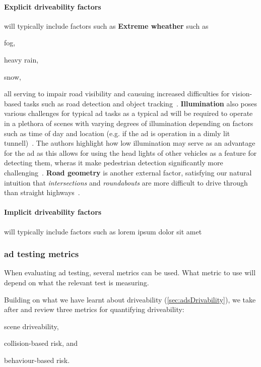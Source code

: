\paragraph{Explicit driveability factors} will typically include factors such as
\textbf{Extreme wheather} such as \begin{inparaenum}
    \item fog,
    \item heavy rain,
    \item snow,
\end{inparaenum}
all serving to impair road visibility and causuing increased difficulties for
vision-based tasks such as road detection and object
tracking~\cite[3136-3137]{safeToDrive}. \textbf{Illumination} also poses
various challenges for typical \acrshort{ad} tasks as a typical \acrshort{ad}
will be required to operate in a plethora of scenes with varying degrees of
illumination depending on factors such as time of day and location (e.g. if the
\acrshort{ad} is operation in a dimly lit tunnell)~\cite[3137]{safeToDrive}. The
authors highlight how low illumination may serve as an advantage for the
\acrshort{ad} as this allows for using the head lights of other vehicles as a
feature for detecting them, wheras it make pedestrian detection significantly
more challenging~\cite[3137]{safeToDrive}. \textbf{Road geometry} is another
external factor, satisfying our natural intuition that \textit{intersections}
and \textit{roundabouts} are more difficult to drive through than straight
highways~\cite[3137]{safeToDrive}.

\paragraph{Implicit driveability factors} will typically include factors such as
lorem ipsum dolor sit amet

\subsubsection*{\acrlong{ad} testing metrics}\label{sec:adsMetrics}

When evaluating \acrshort{ad} testing, several metrics can be used. What metric to use will depend
on what the relevant test is measuring.

Building on what we have learnt about driveability (\cref{sec:adsDrivability}),
we take after \citeauthor{safeToDrive} and review three metrics for
quantifying driveability: \begin{inparaenum}
    \item scene driveability,
    \item collision-based risk, and
    \item behaviour-based risk.
\end{inparaenum}

